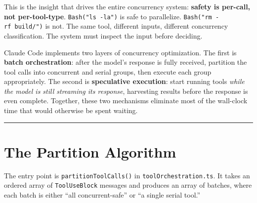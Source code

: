 \documentclass[
  english,
  11pt,
  letterpaper,
]{book}
\begin{document}
This is the insight that drives the entire concurrency system:
\textbf{safety is per-call, not per-tool-type}. \texttt{Bash("ls\ -la")}
is safe to parallelize. \texttt{Bash("rm\ -rf\ build/")} is not. The
same tool, different inputs, different concurrency classification. The
system must inspect the input before deciding.

Claude Code implements two layers of concurrency optimization. The first
is \textbf{batch orchestration}: after the model's response is fully
received, partition the tool calls into concurrent and serial groups,
then execute each group appropriately. The second is \textbf{speculative
execution}: start running tools \emph{while the model is still streaming
its response}, harvesting results before the response is even complete.
Together, these two mechanisms eliminate most of the wall-clock time
that would otherwise be spent waiting.

\begin{center}\rule{0.5\linewidth}{0.5pt}\end{center}

\section{The Partition Algorithm}\label{the-partition-algorithm}

The entry point is \texttt{partitionToolCalls()} in
\texttt{toolOrchestration.ts}. It takes an ordered array of
\texttt{ToolUseBlock} messages and produces an array of batches, where
each batch is either ``all concurrent-safe'' or ``a single serial
tool.''
\end{document}
